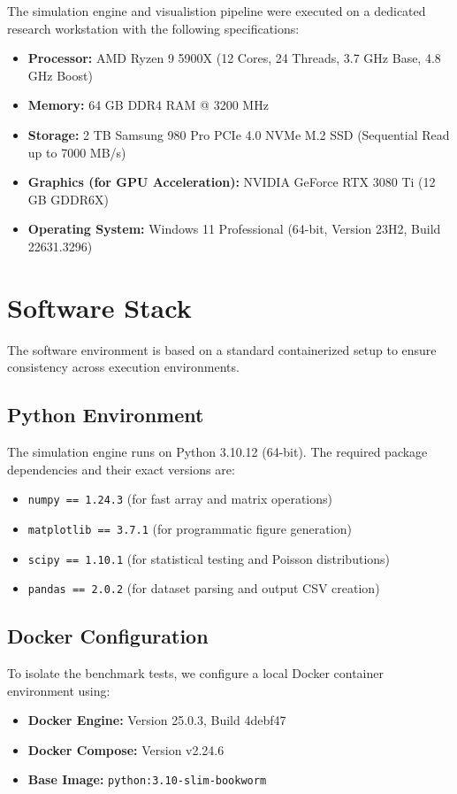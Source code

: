 \documentclass[12pt, oneside, a4paper]{report}
\theoremstyle{definition}
\theoremstyle{remark}
\begin{document}
The simulation engine and visualistion pipeline were executed on a dedicated research workstation with the following specifications:
\begin{itemize}
  \item \textbf{Processor:} AMD Ryzen 9 5900X (12 Cores, 24 Threads, 3.7 GHz Base, 4.8 GHz Boost)
  \item \textbf{Memory:} 64 GB DDR4 RAM @ 3200 MHz
  \item \textbf{Storage:} 2 TB Samsung 980 Pro PCIe 4.0 NVMe M.2 SSD (Sequential Read up to 7000 MB/s)
  \item \textbf{Graphics (for GPU Acceleration):} NVIDIA GeForce RTX 3080 Ti (12 GB GDDR6X)
  \item \textbf{Operating System:} Windows 11 Professional (64-bit, Version 23H2, Build 22631.3296)
\end{itemize}

\section{Software Stack}
\label{sec:ei:software}

The software environment is based on a standard containerized setup to ensure consistency across execution environments.

\subsection{Python Environment}
The simulation engine runs on Python 3.10.12 (64-bit). The required package dependencies and their exact versions are:
\begin{itemize}
  \item \texttt{numpy == 1.24.3} (for fast array and matrix operations)
  \item \texttt{matplotlib == 3.7.1} (for programmatic figure generation)
  \item \texttt{scipy == 1.10.1} (for statistical testing and Poisson distributions)
  \item \texttt{pandas == 2.0.2} (for dataset parsing and output CSV creation)
\end{itemize}

\subsection{Docker Configuration}
To isolate the benchmark tests, we configure a local Docker container environment using:
\begin{itemize}
  \item \textbf{Docker Engine:} Version 25.0.3, Build 4debf47
  \item \textbf{Docker Compose:} Version v2.24.6
  \item \textbf{Base Image:} \texttt{python:3.10-slim-bookworm}
\end{itemize}
\end{document}

